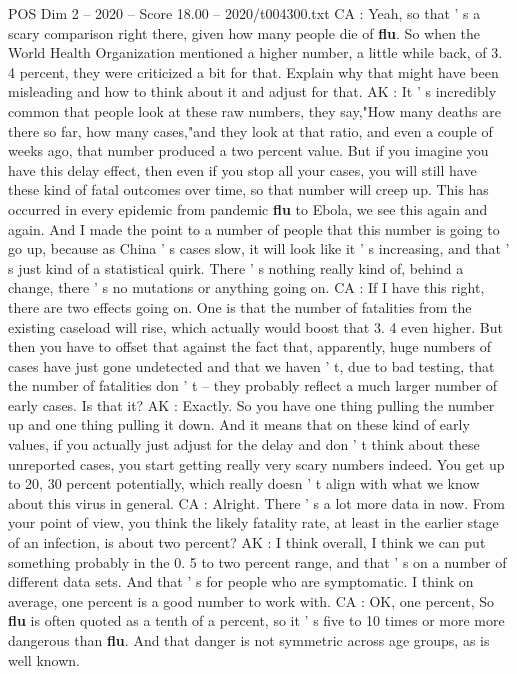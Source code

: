 \begin{textsample}{POS Dim 2 – 2020 – Score 18.00 – 2020/t004300.txt}
CA : Yeah, so that ' s a scary comparison right there, given how many people die of \textbf{flu}.
So when the World Health Organization mentioned a higher number, a little while back, of 3. 4 percent, they were criticized a bit for that.
Explain why that might have been misleading and how to think about it and adjust for that.
AK : It ' s incredibly common that people look at these raw numbers, they say,"How many deaths are there so far, how many cases,"and they look at that ratio, and even a couple of weeks ago, that number produced a two percent value.
But if you imagine you have this delay effect, then even if you stop all your cases, you will still have these kind of fatal outcomes over time, so that number will creep up.
This has occurred in every epidemic from pandemic \textbf{flu} to Ebola, we see this again and again.
And I made the point to a number of people that this number is going to go up, because as China ' s cases slow, it will look like it ' s increasing, and that ' s just kind of a statistical quirk.
There ' s nothing really kind of, behind a change, there ' s no mutations or anything going on.
CA : If I have this right, there are two effects going on.
One is that the number of fatalities from the existing caseload will rise, which actually would boost that 3. 4 even higher.
But then you have to offset that against the fact that, apparently, huge numbers of cases have just gone undetected and that we haven ' t, due to bad testing, that the number of fatalities don ' t -- they probably reflect a much larger number of early cases.
Is that it?
AK : Exactly.
So you have one thing pulling the number up and one thing pulling it down.
And it means that on these kind of early values, if you actually just adjust for the delay and don ' t think about these unreported cases, you start getting really very scary numbers indeed.
You get up to 20, 30 percent potentially, which really doesn ' t align with what we know about this virus in general.
CA : Alright.
There ' s a lot more data in now.
From your point of view, you think the likely fatality rate, at least in the earlier stage of an infection, is about two percent?
AK : I think overall, I think we can put something probably in the 0. 5 to two percent range, and that ' s on a number of different data sets.
And that ' s for people who are symptomatic.
I think on average, one percent is a good number to work with.
CA : OK, one percent, So \textbf{flu} is often quoted as a tenth of a percent, so it ' s five to 10 times or more more dangerous than \textbf{flu}.
And that danger is not symmetric across age groups, as is well known.

\end{textsample}

